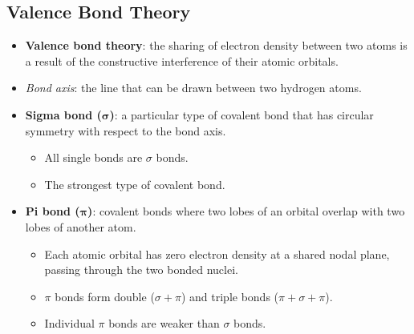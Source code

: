 \documentclass[12pt,a4paper]{article}
\begin{document}
\subsection{Valence Bond Theory}
\begin{itemize}
    \item \textbf{Valence bond theory}: the sharing of electron density between two atoms is a result of the constructive interference of their atomic orbitals.
    \item \textit{Bond axis}: the line that can be drawn between two hydrogen atoms.
    \item \textbf{Sigma bond (\(\bm{\sigma}\))}: a particular type of covalent bond that has circular symmetry with respect to the bond axis.
        \begin{itemize}
            \item All single bonds are $\sigma$ bonds.
            \item The strongest type of covalent bond.
        \end{itemize}
    \item \textbf{Pi bond ($\bm{\pi}$)}: covalent bonds where two lobes of an orbital overlap with two lobes of another atom. 
        \begin{itemize}
            \item Each atomic orbital has zero electron density at a shared nodal plane, passing through the two bonded nuclei.
            \item $\pi$ bonds form double ($\sigma + \pi$) and triple bonds ($\pi + \sigma + \pi$).
            \item Individual $\pi$ bonds are weaker than $\sigma$ bonds.
        \end{itemize}
\end{itemize}
\end{document}
